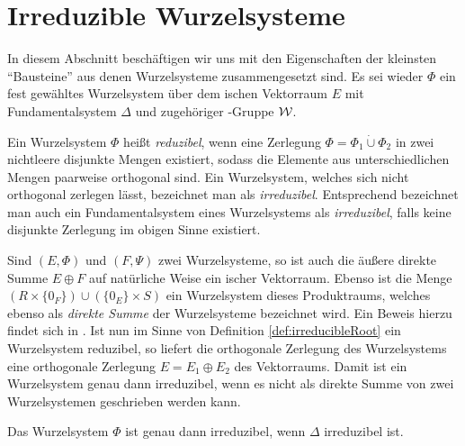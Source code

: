 \section{Irreduzible Wurzelsysteme}
\label{sec:irreduc}

In diesem Abschnitt beschäftigen wir uns mit den Eigenschaften der kleinsten ``Bausteine'' aus denen Wurzelsysteme zusammengesetzt sind.
Es sei wieder $\Phi$ ein fest gewähltes Wurzelsystem über dem \euklid ischen Vektorraum $E$ mit Fundamentalsystem $\Delta$ und zugehöriger \weyl\hyp{}Gruppe $\mathcal{W}$.

\begin{defn}
  \label{def:irreducibleRoot}
  Ein Wurzelsystem $\Phi$ heißt \emph{reduzibel}, wenn eine Zerlegung $\Phi = \Phi_1 \dot{\cup} \Phi_2$ in zwei nichtleere disjunkte Mengen existiert, sodass die Elemente aus unterschiedlichen Mengen paarweise orthogonal sind.
  Ein Wurzelsystem, welches sich nicht orthogonal zerlegen lässt, bezeichnet man als \emph{irreduzibel}.
  Entsprechend bezeichnet man auch ein Fundamentalsystem eines Wurzelsystems als \emph{irreduzibel}, falls keine disjunkte Zerlegung im obigen Sinne existiert.
\end{defn}

\begin{bem}
  Sind $(E,\Phi)$ und $(F,\Psi)$ zwei Wurzelsysteme, so ist auch die äußere direkte Summe $E \oplus F$ auf natürliche Weise ein \euklid ischer Vektorraum.
  Ebenso ist die Menge $(R \times \{0_F\}) \cup (\{0_E\} \times S)$ ein Wurzelsystem dieses Produktraums, welches ebenso als \emph{direkte Summe} der Wurzelsysteme bezeichnet wird.
  Ein Beweis hierzu findet sich in \cite[S.199]{hall2015lie}.
  Ist nun im Sinne von Definition \ref{def:irreducibleRoot} ein Wurzelsystem reduzibel, so liefert die orthogonale Zerlegung des Wurzelsystems eine orthogonale Zerlegung $E = E_1 \oplus E_2$ des Vektorraums.
  Damit ist ein Wurzelsystem genau dann irreduzibel, wenn es nicht als direkte Summe von zwei Wurzelsystemen geschrieben werden kann.
\end{bem}

\begin{lem}
  \label{lem:irreducibleRoot}
  Das Wurzelsystem $\Phi$ ist genau dann irreduzibel, wenn $\Delta$ irreduzibel ist.
\end{lem}

